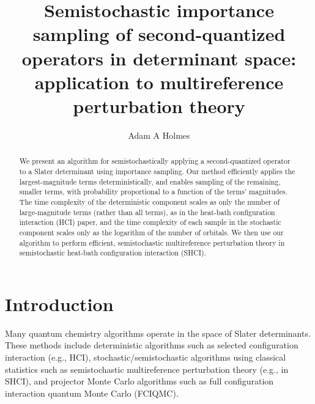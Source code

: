 \documentclass[english]{article}
\title{Semistochastic importance sampling of second-quantized operators in determinant space: application to multireference perturbation theory}
\author{Adam A Holmes}
\begin{document}
\maketitle

\begin{abstract}
We present an algorithm for semistochastically applying a second-quantized operator to a Slater determinant using importance sampling. Our method efficiently applies the largest-magnitude terms deterministically, and enables sampling of the remaining, smaller terms, with probability proportional to a function of the terms' magnitudes. The time complexity of the deterministic component scales as only the number of large-magnitude terms (rather than all terms), as in the heat-bath configuration interaction (HCI) paper, and the time complexity of each sample in the stochastic component scales only as the logarithm of the number of orbitals. We then use our algorithm to perform efficient, semistochastic multireference perturbation theory in semistochastic heat-bath configuration interaction (SHCI).
\end{abstract}

\section{Introduction}
Many quantum chemistry algorithms operate in the space of Slater determinants. These methods include deterministic algorithms such as selected configuration interaction (e.g., HCI), stochastic/semistochastic algorithms using classical statistics such as semistochastic multireference perturbation theory (e.g., in SHCI), and projector Monte Carlo algorithms such as full configuration interaction quantum Monte Carlo (FCIQMC).
\end{document}
